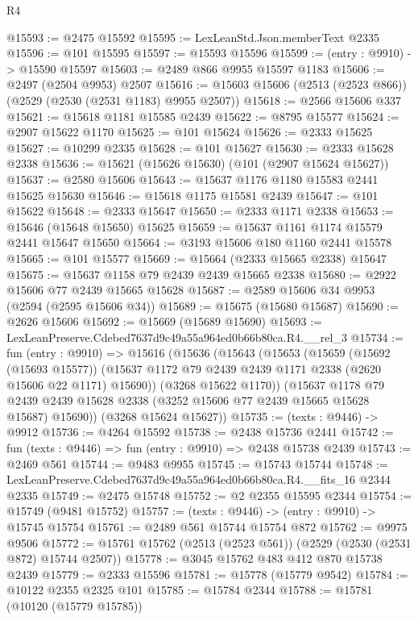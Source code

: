 \begin{lexlean}{R4}
\begin{coremodule}
@15593 := @2475 @15592
@15595 := LexLeanStd.Json.memberText @2335
@15596 := @101 @15595
@15597 := @15593 @15596
@15599 := (entry : @9910) -> @15590 @15597
@15603 := @2489 @866 @9955 @15597 @1183
@15606 := @2497 (@2504 @9953) @2507
@15616 := @15603 @15606 (@2513 (@2523 @866)) (@2529 (@2530 (@2531 @1183) @9955 @2507))
@15618 := @2566 @15606 @337
@15621 := @15618 @1181 @15585 @2439
@15622 := @8795 @15577
@15624 := @2907 @15622 @1170
@15625 := @101 @15624
@15626 := @2333 @15625
@15627 := @10299 @2335
@15628 := @101 @15627
@15630 := @2333 @15628 @2338
@15636 := @15621 (@15626 @15630) (@101 (@2907 @15624 @15627))
@15637 := @2580 @15606
@15643 := @15637 @1176 @1180 @15583 @2441 @15625 @15630
@15646 := @15618 @1175 @15581 @2439
@15647 := @101 @15622
@15648 := @2333 @15647
@15650 := @2333 @1171 @2338
@15653 := @15646 (@15648 @15650) @15625
@15659 := @15637 @1161 @1174 @15579 @2441 @15647 @15650
@15664 := @3193 @15606 @180 @1160 @2441 @15578
@15665 := @101 @15577
@15669 := @15664 (@2333 @15665 @2338) @15647
@15675 := @15637 @1158 @79 @2439 @2439 @15665 @2338
@15680 := @2922 @15606 @77 @2439 @15665 @15628
@15687 := @2589 @15606 @34 @9953 (@2594 (@2595 @15606 @34))
@15689 := @15675 (@15680 @15687)
@15690 := @2626 @15606
@15692 := @15669 (@15689 @15690)
@15693 := LexLeanPreserve.Cdebed7637d9c49a55a964ed0b66b80ca.R4.__rel_3
@15734 := fun (entry : @9910) =>
  @15616
    (@15636
      (@15643
        (@15653
          (@15659
            (@15692 (@15693 @15577))
            (@15637 @1172 @79 @2439 @2439 @1171 @2338 (@2620 @15606 @22 @1171) @15690))
          (@3268 @15622 @1170))
        (@15637
          @1178
          @79
          @2439
          @2439
          @15628
          @2338
          (@3252 @15606 @77 @2439 @15665 @15628 @15687)
          @15690))
      (@3268 @15624 @15627))
@15735 := (texts : @9446) -> @9912
@15736 := @4264 @15592
@15738 := @2438 @15736 @2441
@15742 := fun (texts : @9446) => fun (entry : @9910) => @2438 @15738 @2439
@15743 := @2469 @561
@15744 := @9483 @9955
@15745 := @15743 @15744
@15748 := LexLeanPreserve.Cdebed7637d9c49a55a964ed0b66b80ca.R4.__fits_16 @2344 @2335
@15749 := @2475 @15748
@15752 := @2 @2355 @15595 @2344
@15754 := @15749 (@9481 @15752)
@15757 := (texts : @9446) -> (entry : @9910) -> @15745 @15754
@15761 := @2489 @561 @15744 @15754 @872
@15762 := @9975 @9506
@15772 := @15761 @15762 (@2513 (@2523 @561)) (@2529 (@2530 (@2531 @872) @15744 @2507))
@15778 := @3045 @15762 @483 @412 @870 @15738 @2439
@15779 := @2333 @15596
@15781 := @15778 (@15779 @9542)
@15784 := @10122 @2355 @2325 @101
@15785 := @15784 @2344
@15788 := @15781 (@10120 (@15779 @15785))

\end{coremodule}
\end{lexlean}
